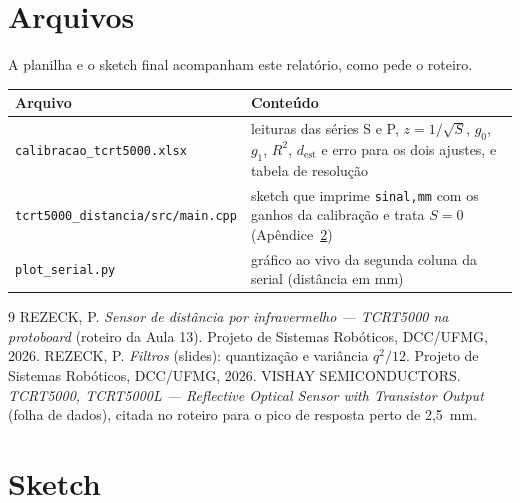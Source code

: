 \documentclass[11pt,a4paper]{article}
\newcommand{\cod}[1]{\texttt{#1}}
\begin{document}
\section{Arquivos}

A planilha e o sketch final acompanham este relatório, como pede o roteiro.

\begin{table}[!htb]
\centering
\small
\begin{tabularx}{\textwidth}{>{\raggedright\arraybackslash}p{6.2cm}X}
\toprule
Arquivo & Conteúdo \\
\midrule
\cod{calibracao\_tcrt5000.xlsx} & leituras das séries S e P, $z = 1/\sqrt{S}$, $g_0$, $g_1$, $R^2$, $d_{\mathrm{est}}$ e erro para os dois ajustes, e tabela de resolução \\
\cod{tcrt5000\_distancia/src/main.cpp} & sketch que imprime \cod{sinal,mm} com os ganhos da calibração e trata $S = 0$ (Apêndice~\ref{ap:sketch}) \\
\cod{plot\_serial.py} & gráfico ao vivo da segunda coluna da serial (distância em mm) \\
\bottomrule
\end{tabularx}
\end{table}

\begin{thebibliography}{9}
 REZECK, P. \emph{Sensor de distância por infravermelho --- TCRT5000 na protoboard} (roteiro da Aula 13). Projeto de Sistemas Robóticos, DCC/UFMG, 2026.
 REZECK, P. \emph{Filtros} (slides): quantização e variância $q^2/12$. Projeto de Sistemas Robóticos, DCC/UFMG, 2026.
 VISHAY SEMICONDUCTORS. \emph{TCRT5000, TCRT5000L --- Reflective Optical Sensor with Transistor Output} (folha de dados), citada no roteiro para o pico de resposta perto de 2,5~mm.
\end{thebibliography}

\appendix
\section{Sketch}
\label{ap:sketch}


\end{document}
